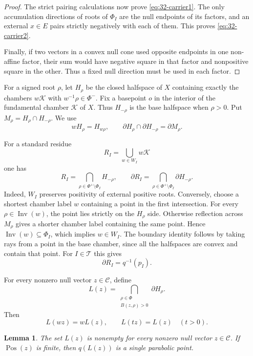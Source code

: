 \documentclass[11pt,reqno]{amsart}
\DeclareMathOperator{\Inv}{Inv}
\theoremstyle{plain}
\newtheorem{lemma}[theorem]{Lemma}
\theoremstyle{definition}
\theoremstyle{remark}
\numberwithin{equation}{section}
\DeclareMathOperator{\Pos}{Pos}
\begin{document}
\begin{proof}
The strict pairing calculations now prove
\eqref{eq:32-carrier1}.
The only accumulation directions of roots of $\Phi_I$
are the null endpoints of its factors, and an external
$x\in E$ pairs strictly negatively with each of them.
This proves \eqref{eq:32-carrier2}.

Finally, if two vectors in a convex null cone used opposite
endpoints in one non-affine factor, their sum would have
negative square in that factor and nonpositive square
in the other.
Thus a fixed null direction must be used in each factor.
\end{proof}

For a signed root $\rho$, let $H_\rho$ be the closed
halfspace of $X$ containing exactly the chambers
$w\mathscr K$ with $w^{-1}\rho\in\Phi^-$. Fix a basepoint $o$ in the interior of the
fundamental chamber $\mathcal K$ of $X$.
Thus $H_{-\rho}$ is the base halfspace when $\rho>0$.
Put $M_\rho=H_\rho\cap H_{-\rho}$.
We use
\[
    wH_\rho=H_{w\rho},
    \qquad
    \partial H_\rho\cap\partial H_{-\rho}
    =\partial M_\rho.
\]

For a standard residue
\[
    R_I=\bigcup_{w\in W_I}w\mathscr K
\]
one has
\begin{equation}\label{eq:32-residue}
    R_I=
    \bigcap_{\rho\in\Phi^+\setminus\Phi_I}H_{-\rho},
    \qquad
    \partial R_I=
    \bigcap_{\rho\in\Phi^+\setminus\Phi_I}
    \partial H_{-\rho}.
\end{equation}
Indeed, $W_I$ preserves positivity of external positive roots.
Conversely, choose a shortest chamber label $w$ containing
a point in the first intersection.
For every $\rho\in\Inv(w)$, the point lies strictly on the
$H_\rho$ side.
Otherwise reflection across $M_\rho$ gives a shorter
chamber label containing the same point.
Hence $\Inv(w)\subseteq\Phi_I$, which implies $w\in W_I$.
The boundary identity follows by taking rays from a point
in the base chamber, since all the halfspaces are convex
and contain that point.
For $I\in\mathcal T$ this gives
\[
    \partial R_I=q^{-1}(p_I).
\]

For every nonzero null vector $z\in\mathcal C$, define
\[
    L(z)=
    \bigcap_{\substack{\rho\in\Phi\\B(z,\rho)>0}}
    \partial H_\rho.
\]
Then
\[
    L(wz)=wL(z),\qquad L(tz)=L(z)\quad(t>0).
\]

\begin{lemma}\label{lem:32-nonempty}
The set $L(z)$ is nonempty for every nonzero null vector
$z\in\mathcal C$.
If $\Pos(z)$ is finite, then $q(L(z))$ is a single
parabolic point.
\end{lemma}
\end{document}
